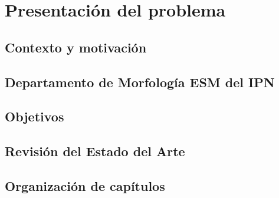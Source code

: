\chapter{Presentación del problema}

\section{Contexto y motivación}

\section{Departamento de Morfología ESM del IPN}

\section{Objetivos}

\section{Revisión del Estado del Arte}

\section{Organización de capítulos}